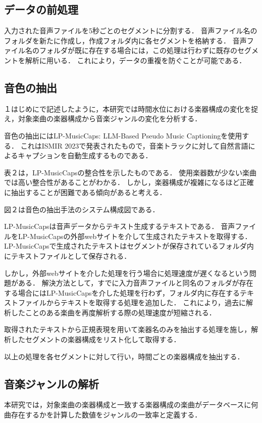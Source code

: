 \subsection{データの前処理}
入力された音声ファイルを5秒ごとのセグメントに分割する．
音声ファイル名のフォルダを新たに作成し，作成フォルダ内に各セグメントを格納する．
音声ファイル名のフォルダが既に存在する場合には，この処理は行わずに既存のセグメントを解析に用いる．
これにより，データの重複を防ぐことが可能である．

\subsection{音色の抽出}
１はじめにで記述したように，本研究では時間水位における楽器構成の変化を捉え，対象楽曲の楽器構成から音楽ジャンルの変化を分析する．

音色の抽出にはLP-MusicCaps: LLM-Based Pseudo Music Captioning\cite{LP}を使用する．
これはISMIR 2023\cite{ISMIR2023}で発表されたもので，音楽トラックに対して自然言語によるキャプションを自動生成するものである．

表２は，LP-MusicCapsの整合性を示したものである．
使用楽器数が少ない楽曲では高い整合性があることがわかる．
しかし，楽器構成が複雑になるほど正確に抽出することが困難である傾向があると考える．

図２は音色の抽出手法のシステム構成図である．

LP-MusicCapsは音声データからテキスト生成するテキストである．
音声ファイルをLP-MusicCapsの外部webサイトを介して生成されたテキストを取得する．
LP-MusicCapsで生成されたテキストはセグメントが保存されているフォルダ内にテキストファイルとして保存される．

しかし，外部webサイトを介した処理を行う場合に処理速度が遅くなるという問題がある．
解決方法として，すでに入力音声ファイルと同名のフォルダが存在する場合にはLP-MusicCapsを介した処理を行わず，フォルダ内に存在するテキストファイルからテキストを取得する処理を追加した．
これにより，過去に解析したことのある楽曲を再度解析する際の処理速度が短縮される．

取得されたテキストから正規表現を用いて楽器名のみを抽出する処理を施し，解析したセグメントの楽器構成をリスト化して取得する．

以上の処理を各セグメントに対して行い，時間ごとの楽器構成を抽出する．

\subsection{音楽ジャンルの解析}
本研究では，対象楽曲の楽器構成と一致する楽器構成の楽曲がデータベースに何曲存在するかを計算した数値をジャンルの一致率と定義する．


